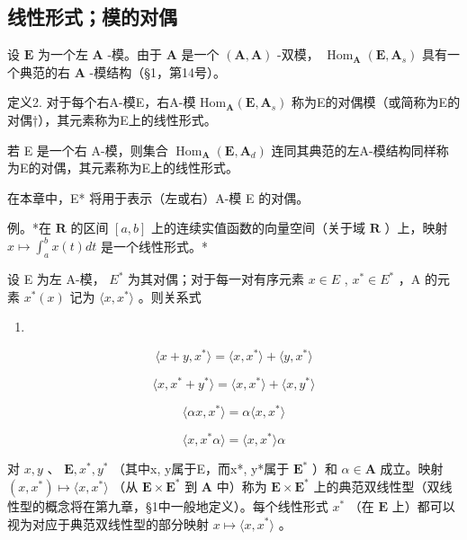 \subsection{线性形式；模的对偶}

设 \(\mathbf{E}\) 为一个左 \(\mathbf{A}\) -模。由于 \(\mathbf{A}\) 是一个 \((\mathbf{A}, \mathbf{A})\) -双模， \(\operatorname{Hom}_{\mathbf{A}}(\mathbf{E}, \mathbf{A}_s)\) 具有一个典范的右 \(\mathbf{A}\) -模结构（§1，第14号）。

定义2. 对于每个右A-模E，右A-模 \(\mathrm{Hom}_{\mathbf{A}}(\mathbf{E},\mathbf{A}_{s})\) 称为E的对偶模（或简称为E的对偶†），其元素称为E上的线性形式。

若 E 是一个右 A-模，则集合 \(\operatorname{Hom}_{\mathbf{A}}(\mathbf{E}, \mathbf{A}_{d})\) 连同其典范的左A-模结构同样称为E的对偶，其元素称为E上的线性形式。

在本章中，E* 将用于表示（左或右）A-模 E 的对偶。

例。*在 \(\mathbf{R}\) 的区间 \([a, b]\) 上的连续实值函数的向量空间（关于域 \(\mathbf{R}\) ）上，映射 \(x \mapsto \int_{a}^{b} x(t) dt\) 是一个线性形式。*

设 E 为左 A-模， \(E^{*}\) 为其对偶；对于每一对有序元素 \(x \in E\) , \(x^{*} \in E^{*}\) ，A 的元素 \(x^{*}(x)\) 记为 \(\langle x, x^{*} \rangle\) 。则关系式

\begin{enumerate}
\def\labelenumi{(\arabic{enumi})}
\setcounter{enumi}{8}
\tightlist
\item
\end{enumerate}

\[
\langle x + y, x ^ {*} \rangle = \langle x, x ^ {*} \rangle + \langle y, x ^ {*} \rangle\tag{10}
\]

\[
\langle x, x ^ {*} + y ^ {*} \rangle = \langle x, x ^ {*} \rangle + \langle x, y ^ {*} \rangle\tag{11}
\]

\[
\langle \alpha x, x ^ {*} \rangle = \alpha \langle x, x ^ {*} \rangle\tag{12}
\]

\[
\langle x, x ^ {*} \alpha \rangle = \langle x, x ^ {*} \rangle \alpha
\]

对 \(x, y\) 、 \(\mathbf{E}, x^*, y^*\) （其中x, y属于E，而x*, y*属于 \(\mathbf{E}^*\) ）和 \(\alpha \in \mathbf{A}\) 成立。映射 \((x, x^*) \mapsto \langle x, x^* \rangle\) （从 \(\mathbf{E} \times \mathbf{E}^*\) 到 \(\mathbf{A}\) 中）称为 \(\mathbf{E} \times \mathbf{E}^*\) 上的典范双线性型（双线性型的概念将在第九章，§1中一般地定义）。每个线性形式 \(x^*\) （在 \(\mathbf{E}\) 上）都可以视为对应于典范双线性型的部分映射 \(x \mapsto \langle x, x^* \rangle\) 。

